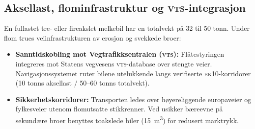 \subsection{Aksellast, flominfrastruktur og \textsc{vts}-integrasjon}
En fullastet tre- eller fireakslet melkebil har en totalvekt på 32 til 50 tonn. Under flom trues veiinfrastrukturen av erosjon og svekkede broer:
\begin{itemize}[leftmargin=1.5em, itemsep=0.2em]
    \item \textbf{Sanntidskobling mot Vegtrafikksentralen (\textsc{vts}):} Flåtestyringen integreres mot Statens vegvesens \textsc{vts}-database over stengte veier. Navigasjonssystemet ruter bilene utelukkende langs verifiserte \textsc{bk}10-korridorer (10 tonns aksellast / 50--60 tonns totalvekt).
    \item \textbf{Sikkerhetskorridorer:} Transporten ledes over høyereliggende europaveier og fylkesveier utenom flomutsatte stikkrenner. Ved usikker bæreevne på sekundære broer benyttes toakslede biler (\SI{15}{\cubic\meter}) for redusert marktrykk.
\end{itemize}
